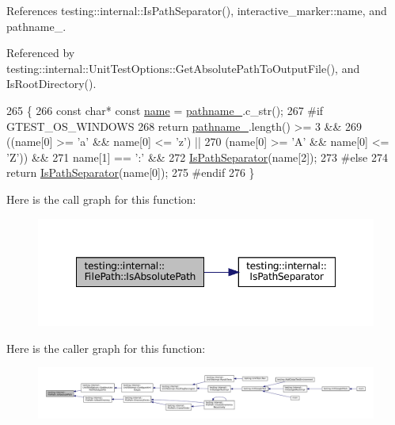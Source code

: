 References testing\+::internal\+::\+Is\+Path\+Separator(), interactive\+\_\+marker\+::name, and pathname\+\_\+.



Referenced by testing\+::internal\+::\+Unit\+Test\+Options\+::\+Get\+Absolute\+Path\+To\+Output\+File(), and Is\+Root\+Directory().


\begin{DoxyCode}
265                                     \{
266   \textcolor{keyword}{const} \textcolor{keywordtype}{char}* \textcolor{keyword}{const} \hyperlink{namespaceinteractive__marker_a447655961b3d3ca3c5a2a9d3d769436d}{name} = \hyperlink{classtesting_1_1internal_1_1FilePath_a12ce28a0015f85604e0372230fa18d6e}{pathname\_}.c\_str();
267 \textcolor{preprocessor}{#if GTEST\_OS\_WINDOWS}
268   \textcolor{keywordflow}{return} \hyperlink{classtesting_1_1internal_1_1FilePath_a12ce28a0015f85604e0372230fa18d6e}{pathname\_}.length() >= 3 &&
269      ((name[0] >= \textcolor{charliteral}{'a'} && name[0] <= \textcolor{charliteral}{'z'}) ||
270       (name[0] >= \textcolor{charliteral}{'A'} && name[0] <= \textcolor{charliteral}{'Z'})) &&
271      name[1] == \textcolor{charliteral}{':'} &&
272      \hyperlink{namespacetesting_1_1internal_a6b8d22cee9edbbfe56077420a6fa1cb1}{IsPathSeparator}(name[2]);
273 \textcolor{preprocessor}{#else}
274   \textcolor{keywordflow}{return} \hyperlink{namespacetesting_1_1internal_a6b8d22cee9edbbfe56077420a6fa1cb1}{IsPathSeparator}(name[0]);
275 \textcolor{preprocessor}{#endif}
276 \}
\end{DoxyCode}
Here is the call graph for this function\+:
\nopagebreak
\begin{figure}[H]
\begin{center}
\leavevmode
\includegraphics[width=348pt]{classtesting_1_1internal_1_1FilePath_ae17e5581e7996021e598851fe947df9c_cgraph}
\end{center}
\end{figure}
Here is the caller graph for this function\+:
\nopagebreak
\begin{figure}[H]
\begin{center}
\leavevmode
\includegraphics[width=350pt]{classtesting_1_1internal_1_1FilePath_ae17e5581e7996021e598851fe947df9c_icgraph}
\end{center}
\end{figure}
